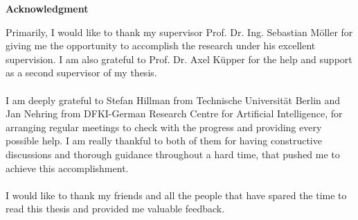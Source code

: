 \thispagestyle{empty}
\vspace*{3cm}

\begin{center}
\textbf{Acknowledgment}
\end{center}

\vspace*{0.5cm}
\noindent
Primarily, I would like to thank my supervisor Prof. Dr. Ing. Sebastian Möller for giving me the opportunity to accomplish the research under his excellent supervision. I am also grateful to Prof. Dr. Axel Küpper for the help and support as a second supervisor of my thesis.
\\~\\
I am deeply grateful to Stefan Hillman from Technische Universität Berlin and Jan Nehring from DFKI-German Research Centre for Artificial Intelligence, for arranging regular meetings to check with the progress and providing every possible help. I am really thankful to both of them for having constructive discussions and thorough guidance throughout a hard time, that pushed me to achieve this accomplishment.
\\~\\
I would like to thank my friends and all the people that have spared the time to read this thesis and provided me valuable feedback.